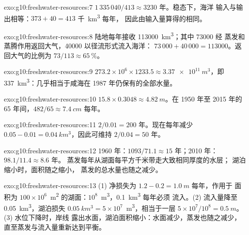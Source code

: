 \begin{solution}{exo:g10:freshwater-resources:7}
$1\,335\,040/413 \approx \num{3230}$ 年。稳态下，海洋
输入与输出相等：$373 + 40 = 413$ 千~\unit{km^3} 每年，
因此由输入量算得的相同。
\end{solution}

\begin{solution}{exo:g10:freshwater-resources:8}
陆地每年接收 \num{113000}~\unit{km^3}；其中 \num{73000} 经
蒸发和蒸腾作用返回大气，\num{40000} 以径流形式流入海洋：
$73\,000 + 40\,000 = \num{113000}$。返回大气的比例为
$73/113 \approx \qty{65}{\percent}$。
\end{solution}

\begin{solution}{exo:g10:freshwater-resources:9}
$273.2 \times 10^6 \times 1233.5 \approx \qty{3.37e11}{m^3}$，即
\qty{337}{km^3}：几乎相当于咸海在
1987 年仍保有的全部水量。
\end{solution}

\begin{solution}{exo:g10:freshwater-resources:10}
$15.8 \times 0.3048 \approx \qty{4.82}{m}$。在 1950 年至
2015 年的 65 年间，$482/65 \approx \qty{7.4}{cm}$ 每年。
\end{solution}

\begin{solution}{exo:g10:freshwater-resources:11}
$2/0.01 = 200$ 年。现在每年减少 $0.05 - 0.01 =
\qty{0.04}{km^3}$，因此可维持 $2/0.04 = 50$ 年。
\end{solution}

\begin{solution}{exo:g10:freshwater-resources:12}
1960 年：$1093/71.1 \approx 15$ 年；2010 年：$98.1/11.4 \approx 8.6$ 年。
蒸发每年从湖面每平方千米带走大致相同厚度的水层；
湖泊缩小时，面积随之缩小，
蒸发的总水量也随之减少。
\end{solution}

\begin{solution}{exo:g10:freshwater-resources:13}
(1) 净损失为 $1.2 - 0.2 = \qty{1.0}{m}$ 每年，作用于
面积为 $100 \times 10^6$~\unit{m^2} 的湖面：$10^8$~\unit{m^3}，\qty{0.1}{km^3} 每年必须
流入。(2) 流入量降至 \qty{0.05}{km^3}，湖泊损失
$\qty{0.05}{km^3} = 5 \times 10^7$~\unit{m^3}，相当于一层
$5 \times 10^7/10^8 = \qty{0.5}{m}$。(3) 水位下降时，岸线
露出水面，湖泊面积缩小：水面减少，蒸发也随之减少，
直至蒸发与流入量重新达到平衡。
\end{solution}

